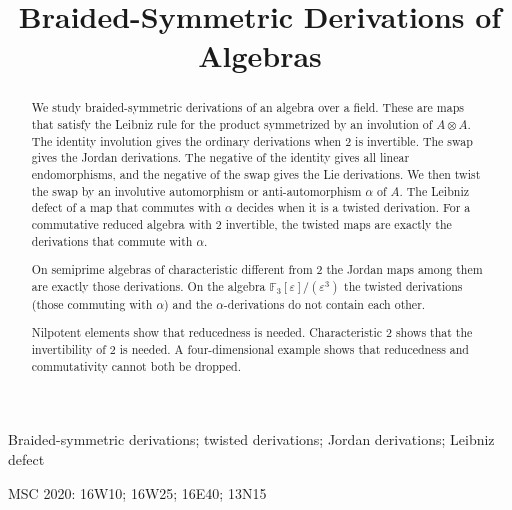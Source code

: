 \documentclass[]{interact}
\theoremstyle{plain}
\theoremstyle{definition}
\theoremstyle{remark}
\newcommand{\paperversion}{84}
\begin{document}
\title{Braided-Symmetric Derivations of Algebras}

\author{
}

\history{Preprint version \paperversion, compiled \today}

\maketitle

\begin{abstract}
We study braided-symmetric derivations of an algebra over a field.
These are maps that satisfy the Leibniz rule for the product symmetrized by an involution of $A \otimes A$.
The identity involution gives the ordinary derivations when $2$ is invertible.
The swap gives the Jordan derivations.
The negative of the identity gives all linear endomorphisms, and the negative of the swap gives the Lie derivations.
We then twist the swap by an involutive automorphism or anti-automorphism $\alpha$ of $A$.
The Leibniz defect of a map that commutes with $\alpha$ decides when it is a twisted derivation.
For a commutative reduced algebra with $2$ invertible, the twisted maps are exactly the derivations that commute with $\alpha$.

On semiprime algebras of characteristic different from $2$ the Jordan maps among them are exactly those derivations.
On the algebra $\mathbb{F}_3[\varepsilon]/(\varepsilon^3)$ the twisted derivations (those commuting with $\alpha$) and the $\alpha$-derivations do not contain each other.

Nilpotent elements show that reducedness is needed. Characteristic $2$ shows that the invertibility of $2$ is needed. A four-dimensional example shows that reducedness and commutativity cannot both be dropped.
\end{abstract}

\begin{keywords}
Braided-symmetric derivations; twisted derivations; Jordan derivations; Leibniz defect
\end{keywords}

\begin{amscode}
MSC 2020: 16W10; 16W25; 16E40; 13N15
\end{amscode}
\end{document}

